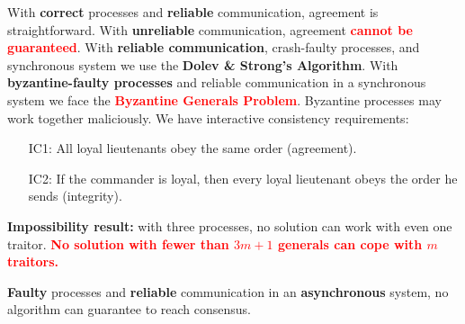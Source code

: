 With \textbf{correct} processes and \textbf{reliable} communication, agreement is straightforward.
With \textbf{unreliable} communication, agreement \textbf{\textcolor{red}{cannot be guaranteed}}.
With \textbf{reliable communication}, crash-faulty processes, and synchronous system we use the \textbf{Dolev \& Strong's Algorithm}.
With \textbf{byzantine-faulty processes} and reliable communication in a synchronous system we face the \textbf{\textcolor{red}{Byzantine Generals Problem}}.
Byzantine processes may work together maliciously. We have interactive consistency requirements:
\begin{itemize}
    \item[IC1:] All loyal lieutenants obey the same order (agreement).
    \item[IC2:] If the commander is loyal, then every loyal lieutenant obeys the order he sends (integrity).
\end{itemize}
\textbf{Impossibility result:} with three processes, no solution can work with even one traitor.
\textbf{\textcolor{red}{No solution with fewer than $3m + 1$ generals can cope with $m$ traitors.}}

\textbf{Faulty} processes and \textbf{reliable} communication in an \textbf{asynchronous} system, no algorithm can guarantee to reach consensus.
